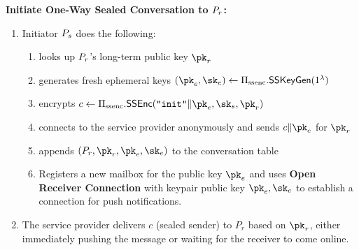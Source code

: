 

\medskip \noindent
\textbf{Initiate One-Way Sealed Conversation to $P_r$:}
\begin{enumerate}
  \item Initiator $P_s$ does the following:
  \begin{enumerate}[nosep]
  \item looks up $P_r$'s long-term public key $\pk_r$
    \item generates fresh ephemeral keys $(\pk_e, \sk_e) \leftarrow \sealedsenderencryptionscheme.\sealedsenderencryptiongen(1^\securityparameter)$%
    \item encrypts $c \leftarrow \sealedsenderencryptionscheme.\sealedsenderencryptionenc(\texttt{``init''} \| \pk_e, \sk_s, \pk_r)$
    \item connects to the service provider anonymously and sends $c \| \pk_e$ for $\pk_r$ 
    \item appends $(\receiverr, \pk_r, \pk_e, \sk_e)$ to the conversation table
    \item Registers a new mailbox for the public key $\pk_e$ and uses \textbf{Open Receiver Connection} with keypair public key $\pk_e, \sk_e$ to establish a connection for push notifications.
  \end{enumerate}

  \item The service provider delivers $c$ (sealed sender) to $P_r$ based on $\pk_r$, either immediately pushing the message or waiting for the receiver to come online.


\end{enumerate}
